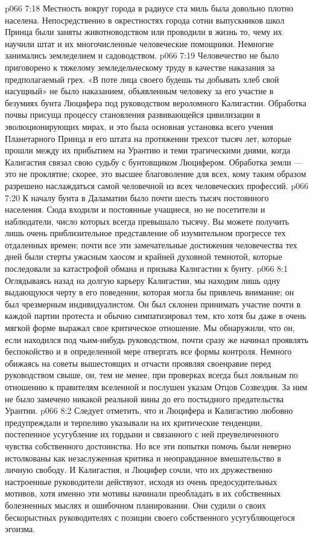 \vs p066 7:18 \pc Местность вокруг города в радиусе ста миль была довольно плотно населена. Непосредственно в окрестностях города сотни выпускников школ Принца были заняты животноводством или проводили в жизнь то, чему их научили штат и их многочисленные человеческие помощники. Немногие занимались земледелием и садоводством.
\vs p066 7:19 Человечество не было приговорено к тяжелому земледельческому труду в качестве наказания за предполагаемый грех. «В поте лица своего будешь ты добывать хлеб свой насущный» не было наказанием, объявленным человеку за его участие в безумиях бунта Люцифера под руководством вероломного Калигастии. Обработка почвы присуща процессу становления развивающейся цивилизации в эволюционирующих мирах, и это была основная установка всего учения Планетарного Принца и его штата на протяжении трехсот тысяч лет, которые прошли между их прибытием на Урантию и теми трагическими днями, когда Калигастия связал свою судьбу с бунтовщиком Люцифером. Обработка земли --- это не проклятие; скорее, это высшее благоволение для всех, кому таким образом разрешено наслаждаться самой человечной из всех человеческих профессий.
\vs p066 7:20 К началу бунта в Даламатии было почти шесть тысяч постоянного населения. Сюда входили и постоянные учащиеся, но не посетители и наблюдатели, число которых всегда превышало тысячу. Вы можете получить лишь очень приблизительное представление об изумительном прогрессе тех отдаленных времен; почти все эти замечательные достижения человечества тех дней были стерты ужасным хаосом и крайней духовной темнотой, которые последовали за катастрофой обмана и призыва Калигастии к бунту.
\vs p066 8:1 Оглядываясь назад на долгую карьеру Калигастии, мы находим лишь одну выдающуюся черту в его поведении, которая могла бы привлечь внимание; он был чрезмерным индивидуалистом. Он был склонен принимать участие почти в каждой партии протеста и обычно симпатизировал тем, кто хотя бы даже в очень мягкой форме выражал свое критическое отношение. Мы обнаружили, что он, если находился под чьим\hyp{}нибудь руководством, почти сразу же начинал проявлять беспокойство и в определенной мере отвергать все формы контроля. Немного обижаясь на советы вышестоящих и отчасти проявляя своенравие перед руководством свыше, он, тем не менее, при проверках всегда был лояльным по отношению к правителям вселенной и послушен указам Отцов Созвездия. За ним не было замечено никакой реальной вины до его постыдного предательства Урантии.
\vs p066 8:2 Следует отметить, что и Люцифера и Калигастию любовно предупреждали и терпеливо указывали на их критические тенденции, постепенное усугубление их гордыни и связанного с ней преувеличенного чувства собственного достоинства. Но все эти попытки помочь были неверно истолкованы как незаслуженная критика и неоправданное вмешательство в личную свободу. И Калигастия, и Люцифер сочли, что их дружественно настроенные руководители действуют, исходя из очень предосудительных мотивов, хотя именно эти мотивы начинали преобладать в их собственных болезненных мыслях и ошибочном планировании. Они судили о своих бескорыстных руководителях с позиции своего собственного усугубляющегося эгоизма.
